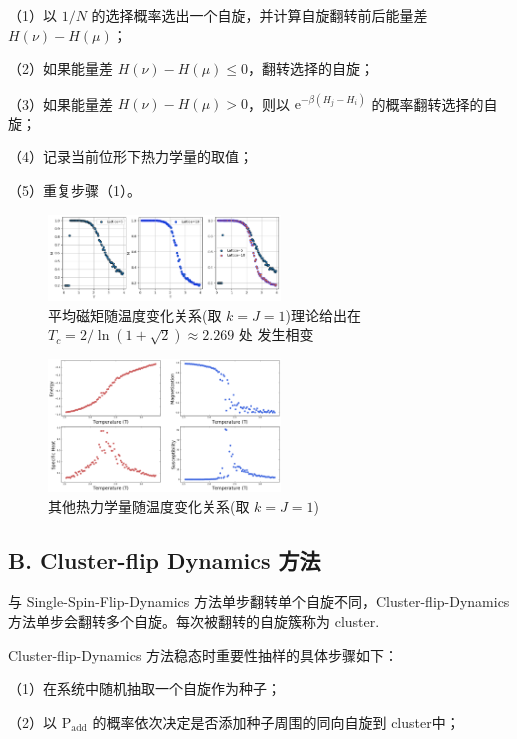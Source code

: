 \documentclass[aps,prl,twocolumn,groupedaddress]{revtex4-2}
\begin{document}
（1）以 $1/N $ 的选择概率选出一个自旋，并计算自旋翻转前后能量差 $H(\nu)-H(\mu) $；

（2）如果能量差 $H(\nu)-H(\mu)\leq 0 $，翻转选择的自旋；

（3）如果能量差 $H(\nu)-H(\mu)> 0 $，则以 $ \mathrm{e}^{-\beta\left(H_j-H_i \right)} $ 的概率翻转选择的自旋；

（4）记录当前位形下热力学量的取值；

（5）重复步骤（1）。

\begin{figure}[htbp]
    \centering
    \includegraphics[width=0.55\textwidth]{img/fig1.png}
    \caption{平均磁矩随温度变化关系(取 $k=J=1$)理论\cite{02}给出在 $T_c=2/\ln(1+\sqrt{2})\approx 2.269 $ 处 发生相变}
    \label{fig1}
\end{figure}

\begin{figure}[htbp]
    \centering
    \includegraphics[width=0.55\textwidth]{img/fig2.png}
    \caption{其他热力学量随温度变化关系(取 $k=J=1$)}
    \label{fig2}
\end{figure}

\subsection{B. Cluster-flip Dynamics 方法}

与 Single-Spin-Flip-Dynamics 方法单步翻转单个自旋不同，Cluster-flip-Dynamics 方法单步会翻转多个自旋。每次被翻转的自旋簇称为 cluster.

Cluster-flip-Dynamics 方法稳态时重要性抽样的具体步骤如下：

（1）在系统中随机抽取一个自旋作为种子；

（2）以 $\mathrm{P}_{\mathrm{add}} $ 的概率依次决定是否添加种子周围的同向自旋到 cluster中；
\end{document}
